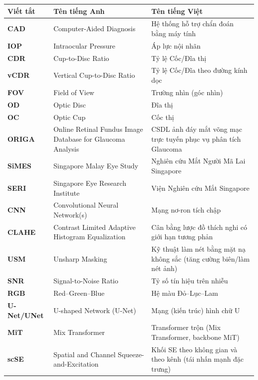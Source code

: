 \documentclass[../DoAn.tex]{subfiles}
\begin{document}
\begingroup
\captionsetup{list=no} %
\begin{center}

\begin{tabular}{l  p{6cm} p{7cm}}
\hline
\textbf{Viết tắt}  & \textbf{Tên tiếng Anh} & \textbf{Tên tiếng Việt} \\ \hline

\textbf{CAD} & Computer-Aided Diagnosis & Hệ thống hỗ trợ chẩn đoán bằng máy tính \\
\textbf{IOP} & Intraocular Pressure & Áp lực nội nhãn \\
\textbf{CDR} & Cup-to-Disc Ratio & Tỷ lệ Cốc/Đĩa thị \\
\textbf{vCDR} & Vertical Cup-to-Disc Ratio & Tỷ lệ Cốc/Đĩa theo đường kính dọc \\
\textbf{FOV} & Field of View & Trường nhìn (góc nhìn) \\
\textbf{OD} & Optic Disc & Đĩa thị \\
\textbf{OC} & Optic Cup & Cốc thị \\
\textbf{ORIGA} & Online Retinal Fundus Image Database for Glaucoma Analysis & CSDL ảnh đáy mắt võng mạc trực tuyến phục vụ phân tích Glaucoma \\
\textbf{SiMES} & Singapore Malay Eye Study & Nghiên cứu Mắt Người Mã Lai Singapore \\
\textbf{SERI} & Singapore Eye Research Institute & Viện Nghiên cứu Mắt Singapore \\
\textbf{CNN} & Convolutional Neural Network(s) & Mạng nơ-ron tích chập \\
\textbf{CLAHE} & Contrast Limited Adaptive Histogram Equalization & Cân bằng lược đồ thích nghi có giới hạn tương phản \\
\textbf{USM} & Unsharp Masking & Kỹ thuật làm nét bằng mặt nạ không sắc (tăng cường biên/làm nét ảnh) \\
\textbf{SNR} & Signal-to-Noise Ratio & Tỷ số tín hiệu trên nhiễu \\
\textbf{RGB} & Red–Green–Blue & Hệ màu Đỏ–Lục–Lam \\
\textbf{U-Net/UNet} & U-shaped Network (U-Net) & Mạng (kiến trúc) hình chữ U \\
\textbf{MiT} & Mix Transformer & Transformer trộn (Mix Transformer, backbone MiT) \\
\textbf{scSE} & Spatial and Channel Squeeze-and-Excitation & Khối SE theo không gian và theo kênh (tái nhấn mạnh đặc trưng) \\

\end{tabular}
\end{center}
\end{document}
